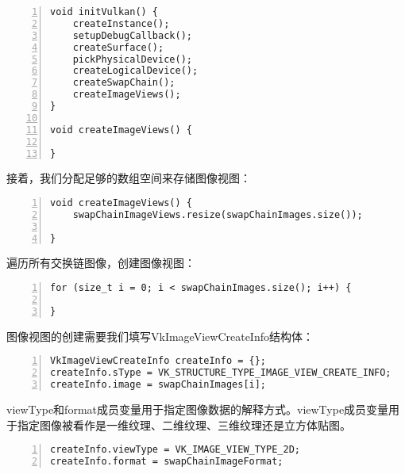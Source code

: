 \documentclass{ctexart}
\begin{document}
\begin{lstlisting}[language={[ANSI]C},keywordstyle=\color{blue!70},commentstyle=\color{red!50!green!50!blue!50},frame=shadowbox, rulesepcolor=\color{red!20!green!20!blue!20},basicstyle=\small,numbers=left, numberstyle=\tiny,breaklines=true]
void initVulkan() {
	createInstance();
	setupDebugCallback();
	createSurface();
	pickPhysicalDevice();
	createLogicalDevice();
	createSwapChain();
	createImageViews();
}

void createImageViews() {

}
\end{lstlisting}

接着，我们分配足够的数组空间来存储图像视图：

\begin{lstlisting}[language={[ANSI]C},keywordstyle=\color{blue!70},commentstyle=\color{red!50!green!50!blue!50},frame=shadowbox, rulesepcolor=\color{red!20!green!20!blue!20},basicstyle=\small,numbers=left, numberstyle=\tiny,breaklines=true]
void createImageViews() {
	swapChainImageViews.resize(swapChainImages.size());

}
\end{lstlisting}

遍历所有交换链图像，创建图像视图：

\begin{lstlisting}[language={[ANSI]C},keywordstyle=\color{blue!70},commentstyle=\color{red!50!green!50!blue!50},frame=shadowbox, rulesepcolor=\color{red!20!green!20!blue!20},basicstyle=\small,numbers=left, numberstyle=\tiny,breaklines=true]
for (size_t i = 0; i < swapChainImages.size(); i++) {

}
\end{lstlisting}

图像视图的创建需要我们填写VkImageViewCreateInfo结构体：

\begin{lstlisting}[language={[ANSI]C},keywordstyle=\color{blue!70},commentstyle=\color{red!50!green!50!blue!50},frame=shadowbox, rulesepcolor=\color{red!20!green!20!blue!20},basicstyle=\small,numbers=left, numberstyle=\tiny,breaklines=true]
VkImageViewCreateInfo createInfo = {};
createInfo.sType = VK_STRUCTURE_TYPE_IMAGE_VIEW_CREATE_INFO;
createInfo.image = swapChainImages[i];
\end{lstlisting}

viewType和format成员变量用于指定图像数据的解释方式。viewType成员变量用于指定图像被看作是一维纹理、二维纹理、三维纹理还是立方体贴图。

\begin{lstlisting}[language={[ANSI]C},keywordstyle=\color{blue!70},commentstyle=\color{red!50!green!50!blue!50},frame=shadowbox, rulesepcolor=\color{red!20!green!20!blue!20},basicstyle=\small,numbers=left, numberstyle=\tiny,breaklines=true]
createInfo.viewType = VK_IMAGE_VIEW_TYPE_2D;
createInfo.format = swapChainImageFormat;
\end{lstlisting}
\end{document}
